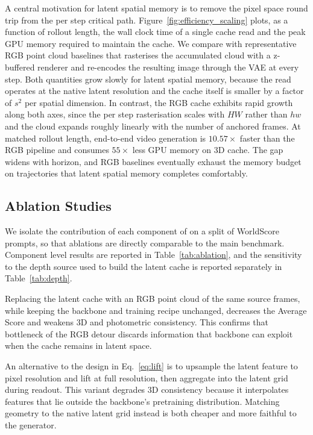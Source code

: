 A central motivation for latent spatial memory is to remove the pixel space round trip from the per step critical path. Figure~\ref{fig:efficiency_scaling} plots, as a function of rollout length, the wall clock time of a single cache read and the peak GPU memory required to maintain the cache. We compare \method{} with representative RGB point cloud baselines that rasterises the accumulated cloud with a z-buffered renderer and re-encodes the resulting image through the VAE at every step. Both quantities grow slowly for latent spatial memory, because the read operates at the native latent resolution and the cache itself is smaller by a factor of $s^2$ per spatial dimension. In contrast, the RGB cache exhibits rapid growth along both axes, since the per step rasterisation scales with $HW$ rather than $hw$ and the cloud expands roughly linearly with the number of anchored frames. At matched rollout length, end-to-end video generation is $10.57\times$ faster than the RGB pipeline and consumes $55\times$ less GPU memory on 3D cache. The gap widens with horizon, and RGB baselines eventually exhaust the memory budget on trajectories that latent spatial memory completes comfortably. 


\subsection{Ablation Studies}
\label{sec:exp:ablation}

We isolate the contribution of each component of \method{} on a split of WorldScore prompts, so that ablations are directly comparable to the main benchmark. Component level results are reported in Table~\ref{tab:ablation}, and the sensitivity to the depth source used to build the latent cache is reported separately in Table~\ref{tab:depth}.

Replacing the latent cache with an RGB point cloud of the same source frames, while keeping the backbone and training recipe unchanged, decreases the Average Score and weakens 3D and photometric consistency. This confirms that bottleneck of the RGB detour discards information that backbone can exploit when the cache remains in latent space.

An alternative to the design in Eq.~\ref{eq:lift} is to upsample the latent feature to pixel resolution and lift at full resolution, then aggregate into the latent grid during readout. 
This variant degrades 3D consistency because it interpolates features that lie outside the backbone's pretraining distribution. 
Matching geometry to the native latent grid instead is both cheaper and more faithful to the generator.

